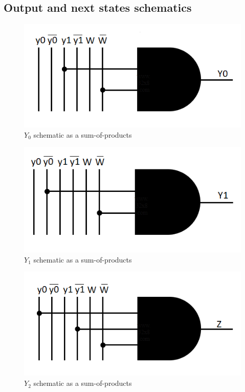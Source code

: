 \documentclass[../../e3_tp3_main.tex]{subfiles}
\begin{document}
\subsection{Output and next states schematics}
\begin{figure}[H]
	\centering
	\includegraphics{figures/Y0_schem_mealy.PNG}
	\caption{$Y_0$ schematic as a sum-of-products}
\end{figure}
\begin{figure}[H]
	\centering
	\includegraphics{figures/Y1_schem_mealy.PNG}
	\caption{$Y_1$ schematic as a sum-of-products}
\end{figure}
\begin{figure}[H]
	\centering
	\includegraphics{figures/Z_schem_mealy.PNG}
	\caption{$Y_2$ schematic as a sum-of-products}
\end{figure}
\end{document}
